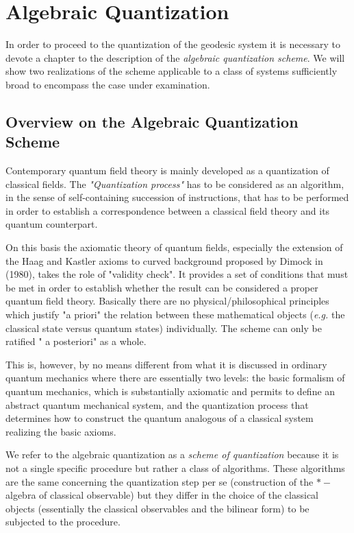\documentclass[Main]{subfiles}
\begin{document}
\chapter{Algebraic Quantization}
In order to proceed to the quantization of the geodesic system  it is necessary to devote a chapter to the description of the \emph{algebraic quantization scheme}.
We will show two realizations of the scheme applicable to a class of systems sufficiently broad to encompass the %
case under examination.

\section{Overview on the Algebraic Quantization Scheme}
Contemporary quantum field theory is mainly developed as a quantization of classical fields.
The \emph{"Quantization process"} has to be considered as an algorithm, in the sense of self-containing succession of instructions, that has to be performed in order to establish a correspondence between a classical field theory and its quantum counterpart.

On this basis the axiomatic theory of quantum fields,
especially the extension of the Haag and Kastler axioms to curved background proposed by Dimock\cite{Dimock1980} in (1980),
takes the role of "validity check".
It provides a set of conditions that must be met in order to establish whether the result can be considered a proper quantum field theory.
Basically there are no physical/philosophical principles which justify "a priori" the relation between these  mathematical objects (\textit{e.g.} the classical state versus quantum states) individually. The scheme can only be ratified " a posteriori" as a whole.%

This is, however, by no means different from what it is discussed in ordinary quantum mechanics where there are essentially two levels:
the basic formalism of quantum mechanics, which is substantially axiomatic and permits to define an abstract quantum mechanical system, and the quantization process that determines how to construct the quantum analogous of a classical system realizing the basic axioms.

We refer to the algebraic quantization as a \emph{scheme of quantization} because it is not a single specific procedure but rather a class of algorithms.
These algorithms are the same concerning the quantization step per se (construction of the $\ast-$algebra of classical observable) but they differ in the choice of the classical objects  (essentially the classical observables and the bilinear form) to be subjected to the procedure.
\end{document}
